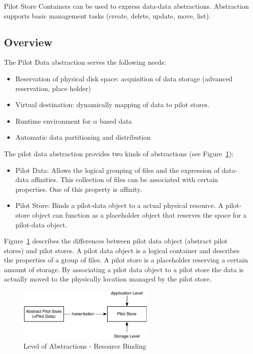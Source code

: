 \documentclass[]{article}
\begin{document}
Pilot Store Containers can be used to express data-data abstractions. 
Abstraction supports basic management tasks (create, delete, update,
move, list). 

\subsection{Overview}

The Pilot Data abstraction serves the following needs:
\begin{itemize}
	\item Reservation of physical disk space: acquisition of data storage (advanced reservation, place holder)
	\item Virtual destination: dynamically mapping of data to pilot stores.
	\item Runtime environment for $\alpha$ based data
	\item Automatic data partitioning and distribution
\end{itemize}


The pilot data abstraction provides two kinds of abstractions (see Figure~\ref{fig:figures_ps-instantiation}):
\begin{itemize}
    \item Pilot Data: Allows the logical grouping of files and the expression of data-data affinities. This collection of files can be associated with certain properties. One of this property is affinity.
    
    \item Pilot Store: Binds a pilot-data object to a actual physical resource. A pilot-store object can function as a placeholder object that reserves the space for a pilot-data object.
\end{itemize}


Figure~\ref{fig:figures_ps-instantiation} describes the differences between
pilot data object (abstract pilot stores) and pilot stores. A pilot data object
is a logical container and describes the properties of a group of files. A pilot
store is a placeholder reserving a certain amount of storage. By associating a
pilot data object to a pilot store the data is actually moved to the physically
location managed by the pilot store.

\begin{figure}[htbp]
    \centering
        \includegraphics[width=0.6\textwidth]{figures/ps-instantiation.pdf}
    \caption{Level of Abstractions - Resource Binding}
    \label{fig:figures_ps-instantiation}
\end{figure}
\end{document}

